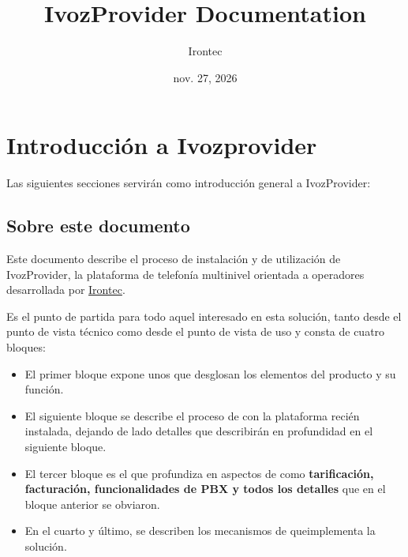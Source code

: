 \documentclass[letterpaper,10pt,spanish]{sphinxmanual}
\title{IvozProvider Documentation}
\date{nov. 27, 2026}
\author{Irontec}
\begin{document}
\maketitle
\tableofcontents
{}\label{index::doc}



\chapter{Introducción a Ivozprovider}
\label{intro/index::doc}\label{intro/index:introduction-to-ivozprovider}\label{intro/index:ivozprovider-official-documentation}
Las siguientes secciones servirán como introducción general a IvozProvider:


\section{Sobre este documento}
\label{intro/about:about-this-document}\label{intro/about::doc}
Este documento describe el proceso de instalación y de utilización de IvozProvider, la plataforma de telefonía multinivel orientada a operadores desarrollada por \href{http://irontec.com}{Irontec}.

Es el punto de partida para todo aquel interesado en esta solución, tanto desde el punto de vista técnico como desde el punto de vista de uso y consta de cuatro bloques:
\begin{itemize}
\item {} 
El primer bloque expone unos {\hyperref[index:concepts]{}} que desglosan los elementos del producto y su función.

\item {} 
El siguiente bloque se describe el proceso de {\hyperref[index:installation]{}} con la plataforma recién instalada, dejando de lado detalles que describirán en profundidad en el siguiente bloque.

\item {} 
El tercer bloque es el que profundiza en aspectos de {\hyperref[index:advanced]{}} como \textbf{tarificación, facturación, funcionalidades de PBX y todos los detalles} que en el bloque anterior se obviaron.

\item {} 
En el cuarto y último, se describen los mecanismos de {\hyperref[index:security]{}} queimplementa la solución.

\end{itemize}
\end{document}
